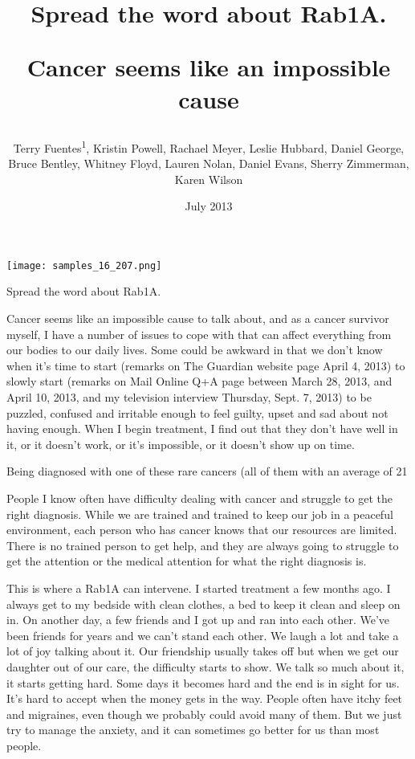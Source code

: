 \documentclass{article}
\title{Spread the word about Rab1A.

Cancer seems like an impossible cause}
\author{Terry Fuentes\textsuperscript{1},  Kristin Powell,  Rachael Meyer,  Leslie Hubbard,  Daniel George,  Bruce Bentley,  Whitney Floyd,  Lauren Nolan,  Daniel Evans,  Sherry Zimmerman,  Karen Wilson}
\affil{\textsuperscript{1}The Graduate University for Advanced Studies}
\date{July 2013}
\begin{document}
\maketitle

\begin{center}
\begin{minipage}{0.75\linewidth}
\texttt{[image: samples\_16\_207.png]}
\end{minipage}
\end{center}

Spread the word about Rab1A.

Cancer seems like an impossible cause to talk about, and as a cancer survivor myself, I have a number of issues to cope with that can affect everything from our bodies to our daily lives. Some could be awkward in that we don’t know when it’s time to start (remarks on The Guardian website page April 4, 2013) to slowly start (remarks on Mail Online Q+A page between March 28, 2013, and April 10, 2013, and my television interview Thursday, Sept. 7, 2013) to be puzzled, confused and irritable enough to feel guilty, upset and sad about not having enough. When I begin treatment, I find out that they don’t have well in it, or it doesn’t work, or it’s impossible, or it doesn’t show up on time.

Being diagnosed with one of these rare cancers (all of them with an average of 21%

People I know often have difficulty dealing with cancer and struggle to get the right diagnosis. While we are trained and trained to keep our job in a peaceful environment, each person who has cancer knows that our resources are limited. There is no trained person to get help, and they are always going to struggle to get the attention or the medical attention for what the right diagnosis is.

This is where a Rab1A can intervene. I started treatment a few months ago. I always get to my bedside with clean clothes, a bed to keep it clean and sleep on in. On another day, a few friends and I got up and ran into each other. We’ve been friends for years and we can’t stand each other. We laugh a lot and take a lot of joy talking about it. Our friendship usually takes off but when we get our daughter out of our care, the difficulty starts to show. We talk so much about it, it starts getting hard. Some days it becomes hard and the end is in sight for us. It’s hard to accept when the money gets in the way. People often have itchy feet and migraines, even though we probably could avoid many of them. But we just try to manage the anxiety, and it can sometimes go better for us than most people.
\end{document}
